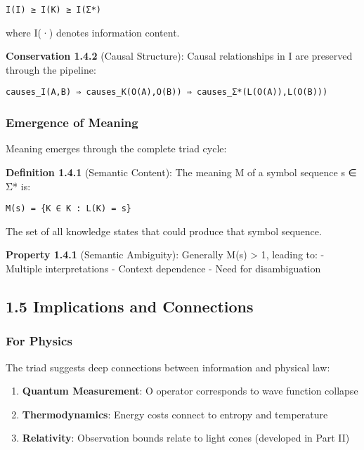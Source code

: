 \begin{verbatim}
I(I) ≥ I(K) ≥ I(Σ*)
\end{verbatim}

where I(·) denotes information content.

\textbf{Conservation 1.4.2} (Causal Structure): Causal relationships in
I are preserved through the pipeline:

\begin{verbatim}
causes_I(A,B) ⇒ causes_K(O(A),O(B)) ⇒ causes_Σ*(L(O(A)),L(O(B)))
\end{verbatim}

\subsubsection{Emergence of Meaning}\label{emergence-of-meaning}

Meaning emerges through the complete triad cycle:

\textbf{Definition 1.4.1} (Semantic Content): The meaning M of a symbol
sequence s ∈ Σ* is:

\begin{verbatim}
M(s) = {K ∈ K : L(K) = s}
\end{verbatim}

The set of all knowledge states that could produce that symbol sequence.

\textbf{Property 1.4.1} (Semantic Ambiguity): Generally
\textbar M(s)\textbar{} \textgreater{} 1, leading to: - Multiple
interpretations - Context dependence - Need for disambiguation

\subsection{1.5 Implications and
Connections}\label{implications-and-connections}

\subsubsection{For Physics}\label{for-physics}

The triad suggests deep connections between information and physical
law:

\begin{enumerate}
\def\labelenumi{\arabic{enumi}.}
\tightlist
\item
  \textbf{Quantum Measurement}: O operator corresponds to wave function
  collapse
\item
  \textbf{Thermodynamics}: Energy costs connect to entropy and
  temperature
\item
  \textbf{Relativity}: Observation bounds relate to light cones
  (developed in Part II)
\end{enumerate}


